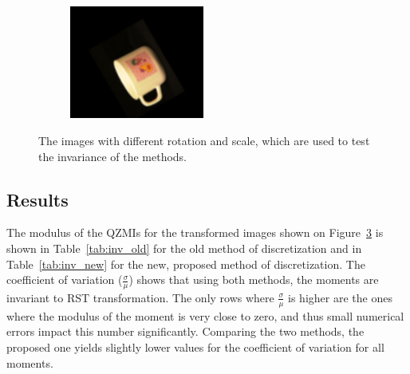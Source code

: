 \begin{figure}[tbp]
\begin{subfigure}{0.3\textwidth}
    \caption{}\label{fig:inv_img5}
	\end{subfigure}
	\begin{subfigure}{0.3\textwidth}
        \centering
    \includegraphics[width=125pt]{figures/inv_img/36x8y5r120s1_25.png}
    \caption{}\label{fig:inv_img6}
	\end{subfigure}
	\caption{The images with different rotation and scale, which are used to test the invariance of the methods.}
	\label{fig:inv_img}
\end{figure}

\subsection{Results}
The modulus of the QZMIs for the transformed images shown on Figure~\ref{fig:inv_img} is shown in Table~\ref{tab:inv_old} for the old method of discretization and in Table~\ref{tab:inv_new} for the new, proposed method of discretization. The coefficient of variation ($\frac{\sigma}{\mu}$) shows that using both methods, the moments are invariant to RST transformation. The only rows where $\frac{\sigma}{\mu}$ is higher are the ones where the modulus of the moment is very close to zero, and thus small numerical errors impact this number significantly. Comparing the two methods, the proposed one yields slightly lower values for the coefficient of variation for all moments.

